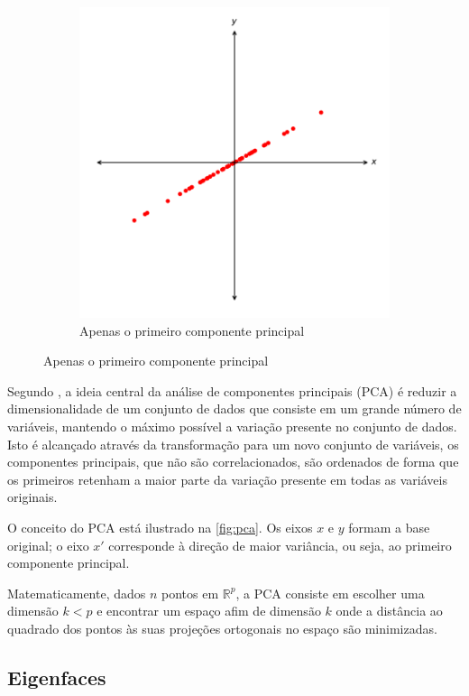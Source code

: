 \begin{figure}[htbp]
\begin{subfigure}[c]{0.45\textwidth}
    \includegraphics[width=\textwidth]{imagens/pca2.pdf}
    \caption{Apenas o primeiro componente principal}
    \end{subfigure}
\end{figure}

Segundo \cite{jolliffe2002principal}, a ideia central da análise de componentes principais (PCA) é reduzir a dimensionalidade de um conjunto de dados que consiste em um grande número de variáveis, mantendo o máximo possível a variação presente no conjunto de dados. Isto é alcançado através da transformação para um novo conjunto de variáveis,
os componentes principais, que não são correlacionados, são
ordenados de forma que os primeiros retenham a maior parte da variação presente em todas as variáveis originais.

O conceito do PCA está ilustrado na \autoref{fig:pca}. Os eixos $x$ e $y$ formam a base original; o eixo $x'$ corresponde à direção de maior variância, ou seja, ao primeiro componente principal.

Matematicamente, dados $n$ pontos em $\mathbb{R}^p$, a PCA consiste em escolher uma dimensão $k < p$ e encontrar um espaço afim de dimensão $k$ onde a distância ao quadrado dos pontos às suas projeções ortogonais no espaço são minimizadas.


\subsection{Eigenfaces}\label{sec:eigenfaces}

